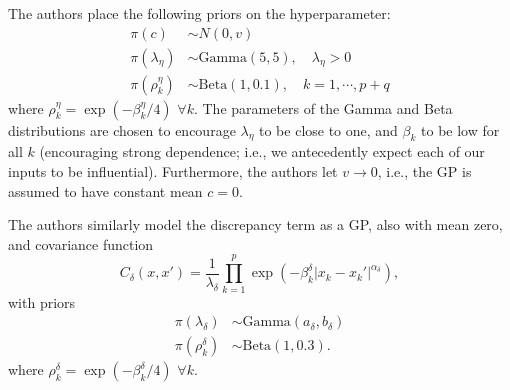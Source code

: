 \documentclass{article}
\begin{document}
The authors place the following priors on the hyperparameter:
\begin{align}
\pi (c) &\sim N(0,v)\\
\pi(\lambda_\eta) &\sim \mathrm{Gamma}(5,5),\quad\lambda_\eta>0\\
\pi\left(\rho_k^\eta\right) &\sim \mathrm{Beta}(1,0.1),\quad k=1,\cdots,p+q
\end{align}
where $\rho_k^\eta=\exp(-\beta_k^\eta/4)$ $\forall k$. The parameters of the Gamma and Beta distributions are chosen to encourage $\lambda_\eta$ to be close to one, and $\beta_k$ to be low for all $k$ (encouraging strong dependence; i.e., we antecedently expect each of our inputs to be influential). Furthermore, the authors let $v\to0$, i.e., the GP is assumed to have constant mean $c=0$.

The authors similarly model the discrepancy term as a GP, also with mean zero, and covariance function
\begin{equation}
C_\delta(x,x') = \frac 1{\lambda_\delta} \prod_{k=1}^p
\exp\left( -\beta_k^\delta |x_k-x_k'|^{\alpha_\delta} \right),
\end{equation}
with priors
\begin{align}
\pi(\lambda_\delta) &\sim \mathrm{Gamma}(a_\delta,b_\delta)\\
\pi(\rho^\delta_k) &\sim \mathrm{Beta}(1,0.3).
\end{align}
where $\rho_k^\delta=\exp(-\beta_k^\delta/4)$ $\forall k$.
\end{document}
